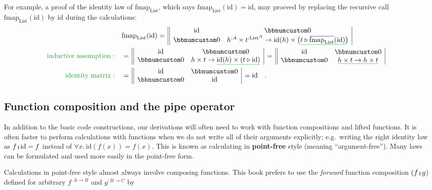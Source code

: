 For example, a proof of the identity law of $\text{fmap}_{\text{List}}$,
which says $\text{fmap}_{\text{List}}(\text{id})=\text{id}$, may
proceed by replacing the recursive call $\overline{\text{fmap}_{\text{List}}}(\text{id})$
by $\text{id}$ during the calculations:
\begin{align*}
 & \text{fmap}_{\text{List}}(\text{id})=\,\begin{array}{||cc|}
\text{id} & \bbnum 0\\
\bbnum 0 & h^{:A}\times t^{:\text{List}^{A}}\rightarrow\text{id}(h)\times\big(\gunderline{t\triangleright\overline{\text{fmap}_{\text{List}}}(\text{id})}\big)
\end{array}\\
{\color{greenunder}\text{inductive assumption}:}\quad & =\,\begin{array}{||cc|}
\text{id} & \bbnum 0\\
\bbnum 0 & h\times t\rightarrow\gunderline{\text{id}(h)\times(t\triangleright\text{id})}
\end{array}\,=\,\begin{array}{||cc|}
\text{id} & \bbnum 0\\
\bbnum 0 & \gunderline{h\times t\rightarrow h\times t}
\end{array}\\
{\color{greenunder}\text{identity matrix}:}\quad & =\,\begin{array}{||cc|}
\text{id} & \bbnum 0\\
\bbnum 0 & \text{id}
\end{array}\,=\text{id}\quad.
\end{align*}


\subsection{Function composition and the pipe operator}

In addition to the basic code constructions, our derivations will
often need to work with function compositions and lifted functions.
It is often faster to perform calculations with functions when we
do not write all of their arguments explicitly; e.g.~writing the
right identity law as $f\bef\text{id}=f$ instead of $\forall x.\,\text{id}(f(x))=f(x)$.
This is known as calculating in \textbf{point-free}
style (meaning \textsf{``}argument-free\textsf{''}). Many laws can be formulated and
used more easily in the point-free form. 

Calculations in point-free style almost always involve composing functions.
This book prefers to use the \emph{forward} function composition $(f\bef g$)
defined for arbitrary $f^{:A\rightarrow B}$ and $g^{:B\rightarrow C}$
by

